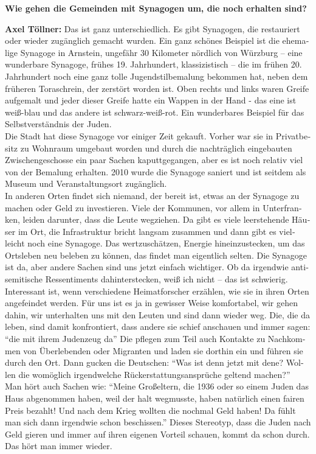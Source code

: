 \begin{otherlanguage}{ngerman}
\textbf{Wie gehen die Gemeinden mit Synagogen um, die noch erhalten sind?} 

\textbf{Axel Töllner:} Das ist ganz unterschiedlich. Es gibt Synagogen, die restauriert oder wieder zugänglich gemacht wurden. Ein ganz schönes Beispiel ist die ehemalige Synagoge in Arnstein, ungefähr 30 Kilometer nördlich von Würzburg – eine wunderbare Synagoge, frühes 19. Jahrhundert, klassizistisch – die im frühen 20. Jahrhundert noch eine ganz tolle Jugendstilbemalung bekommen hat, neben dem früheren Toraschrein, der zerstört worden ist. Oben rechts und links waren Greife aufgemalt und jeder dieser Greife hatte ein Wappen in der Hand - das eine ist weiß-blau und das andere ist schwarz-weiß-rot. Ein wunderbares Beispiel für das Selbstverständnis der Juden.\\ 
Die Stadt hat diese Synagoge vor einiger Zeit gekauft. Vorher war sie in Privatbesitz zu Wohnraum umgebaut worden und durch die nachträglich eingebauten Zwischengeschosse ein paar Sachen kaputtgegangen, aber es ist noch relativ viel von der Bemalung erhalten. 2010 wurde die Synagoge saniert und ist seitdem als Museum und Veranstaltungsort zugänglich.\\ 
In anderen Orten findet sich niemand, der bereit ist, etwas an der Synagoge zu machen oder Geld zu investieren. Viele der Kommunen, vor allem in Unterfranken, leiden darunter, dass die Leute wegziehen. Da gibt es viele leerstehende Häuser im Ort, die Infrastruktur bricht langsam zusammen und dann gibt es vielleicht noch eine Synagoge. Das wertzuschätzen, Energie hineinzustecken, um das Ortsleben neu beleben zu können, das findet man eigentlich selten. Die Synagoge ist da, aber andere Sachen sind uns jetzt einfach wichtiger. Ob da irgendwie antisemitische Ressentiments dahinterstecken, weiß ich nicht – das ist schwierig.\\ 
Interessant ist, wenn verschiedene Heimatforscher erzählen, wie sie in ihren Orten angefeindet werden. Für uns ist es ja in gewisser Weise komfortabel, wir gehen dahin, wir unterhalten uns mit den Leuten und sind dann wieder weg. Die, die da leben, sind damit konfrontiert, dass andere sie schief anschauen und immer sagen: "`die mit ihrem Judenzeug da"' Die pflegen zum Teil auch Kontakte zu Nachkommen von Überlebenden oder Migranten und laden sie dorthin ein und führen sie durch den Ort. Dann gucken die Deutschen: "`Was ist denn jetzt mit dene? Wollen die womöglich irgendwelche Rückerstattungsansprüche geltend machen?"'\\ 
Man hört auch Sachen wie: "`Meine Großeltern, die 1936 oder so einem Juden das Haus abgenommen haben, weil der halt wegmusste, haben natürlich einen fairen Preis bezahlt! Und nach dem Krieg wollten die nochmal Geld haben! Da fühlt man sich dann irgendwie schon beschissen."' Dieses Stereotyp, dass die Juden nach Geld gieren und immer auf ihren eigenen Vorteil schauen, kommt da schon durch. Das hört man immer wieder.\\ 

\end{otherlanguage}
